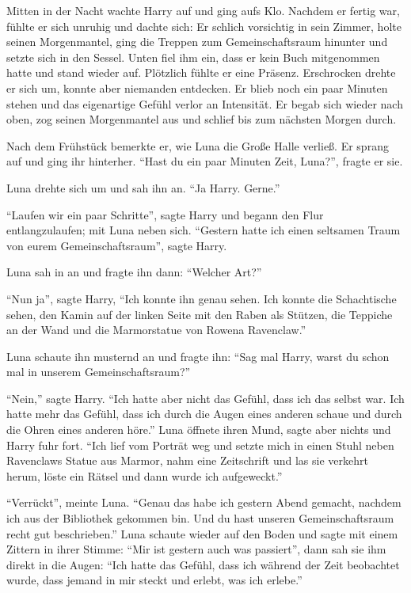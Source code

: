 Mitten in der Nacht wachte Harry auf und ging aufs Klo. Nachdem er fertig war, fühlte er sich unruhig und dachte sich:  Er schlich vorsichtig in sein Zimmer, holte seinen Morgenmantel, ging die Treppen zum Gemeinschaftsraum hinunter und setzte sich in den Sessel. Unten fiel ihm ein, dass er kein Buch mitgenommen hatte und stand wieder auf. Plötzlich fühlte er eine Präsenz. Erschrocken drehte er sich um, konnte aber niemanden entdecken. Er blieb noch ein paar Minuten stehen und das eigenartige Gefühl verlor an Intensität. Er begab sich wieder nach oben, zog seinen Morgenmantel aus und schlief bis zum nächsten Morgen durch.

Nach dem Frühstück bemerkte er, wie Luna die Große Halle verließ. Er sprang auf und ging ihr hinterher. \enquote{Hast du ein paar Minuten Zeit, Luna?}, fragte er sie.

Luna drehte sich um und sah ihn an. \enquote{Ja Harry. Gerne.}

\enquote{Laufen wir ein paar Schritte}, sagte Harry und begann den Flur entlangzulaufen; mit Luna neben sich. \enquote{Gestern hatte ich einen seltsamen Traum von eurem Gemeinschaftsraum}, sagte Harry.

Luna sah in an und fragte ihn dann: \enquote{Welcher Art?}

\enquote{Nun ja}, sagte Harry, \enquote{Ich konnte ihn genau sehen. Ich konnte die Schachtische sehen, den Kamin auf der linken Seite mit den Raben als Stützen, die Teppiche an der Wand und die Marmorstatue von Rowena Ravenclaw.}

Luna schaute ihn musternd an und fragte ihn: \enquote{Sag mal Harry, warst du schon mal in unserem Gemeinschaftsraum?}

\enquote{Nein,} sagte Harry. \enquote{Ich hatte aber nicht das Gefühl, dass ich das selbst war. Ich hatte mehr das Gefühl, dass ich durch die Augen eines anderen schaue und durch die Ohren eines anderen höre.} Luna öffnete ihren Mund, sagte aber nichts und Harry fuhr fort. \enquote{Ich lief vom Porträt weg und setzte mich in einen Stuhl neben Ravenclaws Statue aus Marmor, nahm eine Zeitschrift und las sie \gst verkehrt herum, löste ein Rätsel und dann wurde ich aufgeweckt.}

\enquote{Verrückt}, meinte Luna. \enquote{Genau das habe ich gestern Abend gemacht, nachdem ich aus der Bibliothek gekommen bin. Und du hast unseren Gemeinschaftsraum recht gut beschrieben.} Luna schaute wieder auf den Boden und sagte mit einem Zittern in ihrer Stimme: \enquote{Mir ist gestern auch was passiert}, dann sah sie ihm direkt in die Augen: \enquote{Ich hatte das Gefühl, dass ich während der Zeit beobachtet wurde, dass jemand in mir steckt und erlebt, was ich erlebe.}

